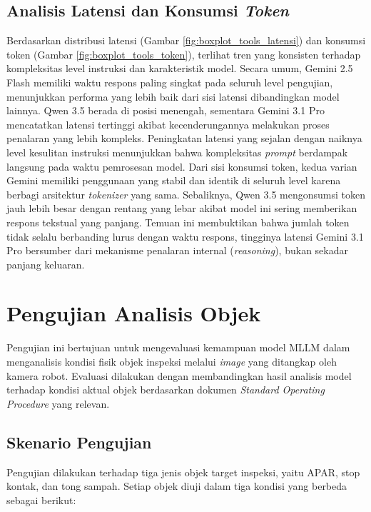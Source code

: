 \subsection{Analisis Latensi dan Konsumsi \textit{Token}}
Berdasarkan distribusi latensi (Gambar \ref{fig:boxplot_tools_latensi}) dan konsumsi token (Gambar \ref{fig:boxplot_tools_token}), terlihat tren yang konsisten terhadap kompleksitas level instruksi dan karakteristik model. Secara umum, Gemini 2.5 Flash memiliki waktu respons paling singkat pada seluruh level pengujian, menunjukkan performa yang lebih baik dari sisi latensi dibandingkan model lainnya. Qwen 3.5 berada di posisi menengah, sementara Gemini 3.1 Pro mencatatkan latensi tertinggi akibat kecenderungannya melakukan proses penalaran yang lebih kompleks. Peningkatan latensi yang sejalan dengan naiknya level kesulitan instruksi menunjukkan bahwa kompleksitas \textit{prompt} berdampak langsung pada waktu pemrosesan model. Dari sisi konsumsi token, kedua varian Gemini memiliki penggunaan yang stabil dan identik di seluruh level karena berbagi arsitektur \textit{tokenizer} yang sama. Sebaliknya, Qwen 3.5 mengonsumsi token jauh lebih besar dengan rentang yang lebar akibat model ini sering memberikan respons tekstual yang panjang. Temuan ini membuktikan bahwa jumlah token tidak selalu berbanding lurus dengan waktu respons, tingginya latensi Gemini 3.1 Pro bersumber dari mekanisme penalaran internal (\textit{reasoning}), bukan sekadar panjang keluaran.

\section{Pengujian Analisis Objek}
\label{sec:pengujian_inspeksi}
Pengujian ini bertujuan untuk mengevaluasi kemampuan model MLLM dalam menganalisis kondisi fisik objek inspeksi melalui \textit{image} yang ditangkap oleh kamera robot. Evaluasi dilakukan dengan membandingkan hasil analisis model terhadap kondisi aktual objek berdasarkan dokumen \textit{Standard Operating Procedure} yang relevan.

\subsection{Skenario Pengujian}
Pengujian dilakukan terhadap tiga jenis objek target inspeksi, yaitu APAR, stop kontak, dan tong sampah. Setiap objek diuji dalam tiga kondisi yang berbeda sebagai berikut:

